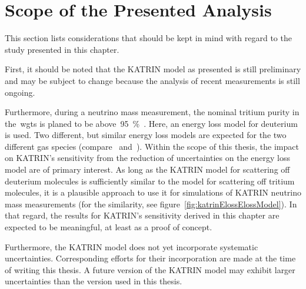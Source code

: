 \section{Scope of the Presented Analysis}
\label{sec:katrinElossValidity}
This section lists considerations that should be kept in mind with regard to the study presented in this chapter.

First, it should be noted that the KATRIN model as presented is still preliminary and may be subject to change because the analysis of recent measurements is still ongoing.

Furthermore, during a neutrino mass measurement, the nominal tritium purity in the~\gls{wgts} is planed to be above~\SI{95}{\percent}~\cite{Angrik:2005ep}. Here, an energy loss model for deuterium is used. Two different, but similar energy loss models are expected for the two different gas species (compare~\cite{Abdurashitov2017} and~\cite{Aseev2000}). Within the scope of this thesis, the impact on KATRIN's sensitivity from the reduction of uncertainties on the energy loss model are of primary interest. As long as the KATRIN model for scattering off deuterium molecules is sufficiently similar to the model for scattering off tritium molecules, it is a plausible approach to use it for simulations of KATRIN neutrino mass measurements (for the similarity, see figure~\ref{fig:katrinElossElossModel}). In that regard, the results for KATRIN's sensitivity derived in this chapter are expected to be meaningful, at least as a proof of concept.

Furthermore, the KATRIN model does not yet incorporate systematic uncertainties. Corresponding efforts for their incorporation are made at the time of writing this thesis. A future version of the KATRIN model may exhibit larger uncertainties than the version used in this thesis.
\FloatBarrier


\def\currentRootFolder{chapter/sensitivityStudyWithPreliminaryKatrinElossModel}
\def\currentFigureFolder{\currentRootFolder/fig}
\FloatBarrier
